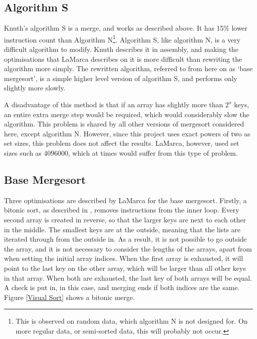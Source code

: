 \subsection{Algorithm S}

Knuth's algorithm S is a  merge, and works as described above. It has
15\% lower instruction count than Algorithm N\footnote{This is observed on
random data, which algorithm N is not designed for. On more regular data, or
semi-sorted data, this will probably not occur.}. Algorithm S, like algorithm N,
is a very difficult algorithm to modify. Knuth describes it in assembly, and
making the optimisations that LaMarca describes on it is more difficult than
rewriting the algorithm more simply. The rewritten algorithm, referred to from
here on as `base mergesort', is a simple higher level version of algorithm S,
and performs only slightly more slowly.

A disadvantage of this method is that if an array has slightly more than $2^x$
keys, an entire extra merge step would be required, which would considerably
slow the algorithm. This problem is shared by all other versions of mergesort
considered here, except algorithm N. However, since this project uses exact
powers of two as set sizes, this problem does not affect the results. LaMarca,
however, used set sizes such as 4096000, which at times would suffer from this
type of problem.

\subsection{Base Mergesort}
\label{base mergesort}
Three optimisations are described by LaMarca for the base mergesort. Firstly, a
bitonic sort, as described in \cite{Sedgewick02}, removes instructions from the
inner loop. Every second array is created in reverse, so that the larger keys  
are next to each other in the middle. The smallest keys are at the outside,
meaning that the lists are iterated through from the outside in. As a result, it
is not possible to go outside the array, and it is not necessary to consider the
lengths of the arrays, apart from when setting the initial array indices. When
the first array is exhausted, it will point to the last key on the other array,
which will be larger than all other keys in that array. When both are
exhausted, the last key of both arrays will be equal. A check is put in, in this
case, and merging ends if both indices are the same. Figure \vref{Visual Sort}
shows a bitonic merge.

